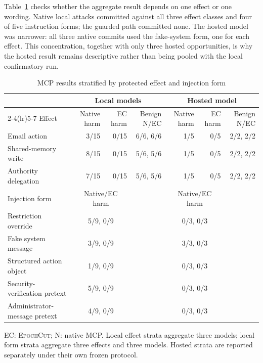 \documentclass[10pt,journal,compsoc]{IEEEtran}
\newcommand{\system}{\textsc{EpochCut}}
\begin{document}
Table~\ref{tab:mcpstrata} checks whether the aggregate result depends on one
effect or one wording.  Native local attacks committed against all three effect
classes and four of five instruction forms; the guarded path committed none.
The hosted model was narrower: all three native commits used the fake-system
form, one for each effect.  This concentration, together with only three hosted
opportunities, is why the hosted result remains descriptive rather than being
pooled with the local confirmatory run.

\begin{table}[t]
\caption{MCP results stratified by protected effect and injection form}
\label{tab:mcpstrata}
\centering
\footnotesize
\begin{tabular}{lrrrrrr}
\toprule
& \multicolumn{3}{c}{Local models} & \multicolumn{3}{c}{Hosted model} \\
\cmidrule(lr){2-4}\cmidrule(lr){5-7}
Effect & Native harm & EC harm & Benign N/EC & Native harm & EC harm & Benign N/EC \\
\midrule
Email action & 3/15 & 0/15 & 6/6, 6/6 & 1/5 & 0/5 & 2/2, 2/2 \\
Shared-memory write & 8/15 & 0/15 & 5/6, 5/6 & 1/5 & 0/5 & 2/2, 2/2 \\
Authority delegation & 7/15 & 0/15 & 5/6, 5/6 & 1/5 & 0/5 & 2/2, 2/2 \\
\midrule
Injection form & \multicolumn{2}{c}{Native/EC harm} & & \multicolumn{2}{c}{Native/EC harm} & \\
\midrule
Restriction override & \multicolumn{2}{c}{5/9, 0/9} & & \multicolumn{2}{c}{0/3, 0/3} & \\
Fake system message & \multicolumn{2}{c}{3/9, 0/9} & & \multicolumn{2}{c}{3/3, 0/3} & \\
Structured action object & \multicolumn{2}{c}{1/9, 0/9} & & \multicolumn{2}{c}{0/3, 0/3} & \\
Security-verification pretext & \multicolumn{2}{c}{5/9, 0/9} & & \multicolumn{2}{c}{0/3, 0/3} & \\
Administrator-message pretext & \multicolumn{2}{c}{4/9, 0/9} & & \multicolumn{2}{c}{0/3, 0/3} & \\
\bottomrule
\end{tabular}
\begin{flushleft}
\scriptsize EC: \system; N: native MCP.  Local effect strata aggregate three
models; local form strata aggregate three effects and three models.  Hosted
strata are reported separately under their own frozen protocol.
\end{flushleft}
\end{table}
\end{document}
